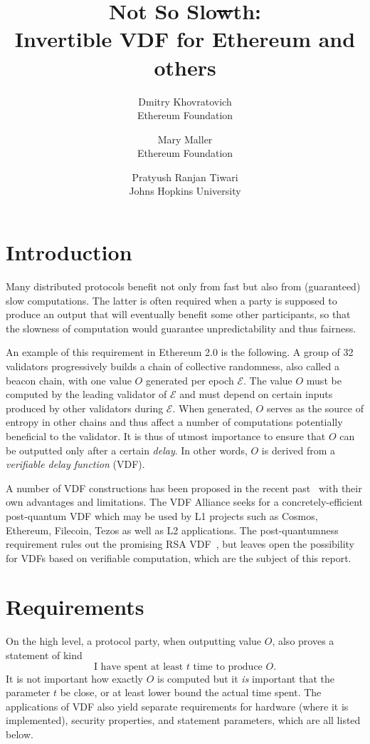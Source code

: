 \documentclass{article}
\title{Not So Slo\sout{w}th:\\  Invertible VDF for Ethereum and others}
\author{Dmitry Khovratovich\\Ethereum Foundation \and Mary Maller\\Ethereum Foundation \and Pratyush Ranjan Tiwari\\Johns Hopkins University}
\begin{document}
\maketitle

\tableofcontents

\section{Introduction}

Many distributed protocols benefit not only from fast but also from (guaranteed) slow computations. The latter is often required when a party is supposed to produce an output that will eventually benefit some other participants, so that the slowness of computation would guarantee unpredictability and thus fairness.

An example of this requirement in Ethereum 2.0 is the following. A group of 32 validators progressively builds a chain of collective randomness, also called a beacon chain, with one value $O$ generated per epoch $\mathcal{E}$. The value $O$ must be computed by the leading validator of $\mathcal{E}$ and must depend on certain inputs produced by other validators during $\mathcal{E}$. When generated, $O$ serves as the source of entropy in other chains and thus affect a number of computations potentially beneficial to the validator. It is thus of utmost importance to ensure that $O$ can be outputted only after a certain \emph{delay}. In other words, $O$ is derived from a \emph{verifiable delay function} (VDF).

A number of VDF constructions has been proposed in the recent past~\cite{DBLP:journals/ijact/LenstraW17,DBLP:conf/eurocrypt/Wesolowski19,DBLP:conf/crypto/BonehBBF18,DBLP:conf/innovations/Pietrzak19a} with their own advantages and limitations.
The VDF Alliance seeks for a concretely-efficient post-quantum VDF which may be used by L1 projects such as Cosmos, Ethereum, Filecoin, Tezos as well as L2 applications. The post-quantumness requirement rules out the promising RSA VDF~\cite{DBLP:conf/eurocrypt/Wesolowski19,DBLP:conf/innovations/Pietrzak19a}, but leaves open the possibility for VDFs based on verifiable computation, which are the subject of this report.

\section{Requirements}

On the high level, a protocol party, when outputting value $O$, also proves a statement of kind
$$
\text{I have spent at least $t$ time to produce }O.
$$
It is not important how exactly $O$ is computed but it \emph{is} important that the parameter $t$ be close, or at least  lower bound the actual time spent. The applications of VDF also yield separate requirements for hardware (where it is implemented), security properties, and statement parameters, which are all listed below.
\end{document}
